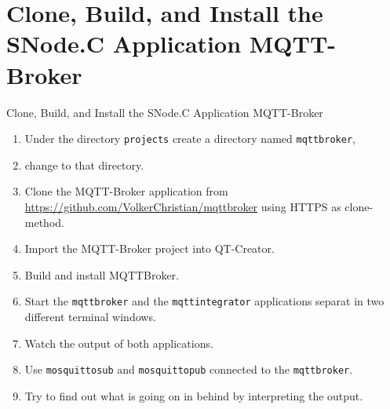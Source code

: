 \section{Clone, Build, and Install the SNode.C Application MQTT-Broker}

\begin{frame}{Clone, Build, and Install the SNode.C Application MQTT-Broker}
  \begin{enumerate}
    \item Under the directory \lstinline|projects| create a directory named \lstinline|mqttbroker|,
    \item change to that directory.
    \item Clone the MQTT-Broker application from \textcolor{fh-ooe-red}{\href{https://github.com/VolkerChristian/mqttbroker}{https://github.com/VolkerChristian/mqttbroker}} using \textcolor{fh-ooe-red}{HTTPS} as clone-method.
    \item Import the MQTT-Broker project into QT-Creator.
    \item Build and install MQTTBroker.
    \item Start the \texttt{\textcolor{fh-ooe-red}{mqttbroker}} and the \texttt{\textcolor{fh-ooe-red}{mqttintegrator}} applications separat in two different terminal windows.
    \item Watch the output of both applications.
    \item Use \texttt{\textcolor{fh-ooe-red}{mosquitto\textunderscore{}sub}} and  \texttt{\textcolor{fh-ooe-red}{mosquitto\textunderscore{}pub}} connected to the \texttt{\textcolor{fh-ooe-red}{mqttbroker}}.
    \item Try to find out what is going on in behind by interpreting the output.
  \end{enumerate}
\end{frame}
